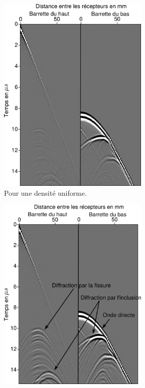 \begin{figure}
	\centering
	\begin{subfigure}[b]{0.45\textwidth}
		\centering
		\includegraphics[width=0.8\textwidth]{img/rho_sur_donnees/data_rho_uni.png}
		\caption{Pour une densité uniforme.}
	\end{subfigure}
		\begin{subfigure}[b]{0.45\textwidth}
		\centering
		\includegraphics[width=0.8\textwidth]{img/rho_sur_donnees/data_rho_vrai.png}

\end{subfigure}
\end{figure}
